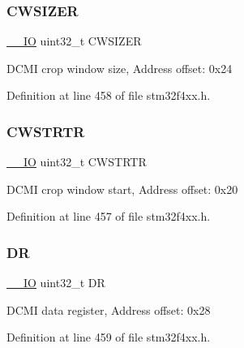 \subsubsection{\texorpdfstring{C\+W\+S\+I\+Z\+ER}{CWSIZER}}
{\footnotesize\ttfamily \hyperlink{group___c_m_s_i_s__core__definitions_gaec43007d9998a0a0e01faede4133d6be}{\+\_\+\+\_\+\+IO} uint32\+\_\+t C\+W\+S\+I\+Z\+ER}

D\+C\+MI crop window size, Address offset\+: 0x24 

Definition at line 458 of file stm32f4xx.\+h.

\mbox{\label{struct_d_c_m_i___type_def_a919b70dd8762e44263a02dfbafc7b8ce}} 
\subsubsection{\texorpdfstring{C\+W\+S\+T\+R\+TR}{CWSTRTR}}
{\footnotesize\ttfamily \hyperlink{group___c_m_s_i_s__core__definitions_gaec43007d9998a0a0e01faede4133d6be}{\+\_\+\+\_\+\+IO} uint32\+\_\+t C\+W\+S\+T\+R\+TR}

D\+C\+MI crop window start, Address offset\+: 0x20 

Definition at line 457 of file stm32f4xx.\+h.

\mbox{\label{struct_d_c_m_i___type_def_a3df0d8dfcd1ec958659ffe21eb64fa94}} 
\subsubsection{\texorpdfstring{DR}{DR}}
{\footnotesize\ttfamily \hyperlink{group___c_m_s_i_s__core__definitions_gaec43007d9998a0a0e01faede4133d6be}{\+\_\+\+\_\+\+IO} uint32\+\_\+t DR}

D\+C\+MI data register, Address offset\+: 0x28 

Definition at line 459 of file stm32f4xx.\+h.

\mbox{\label{struct_d_c_m_i___type_def_a9cc4ec74be864c929261e0810f2fd7f0}} 
